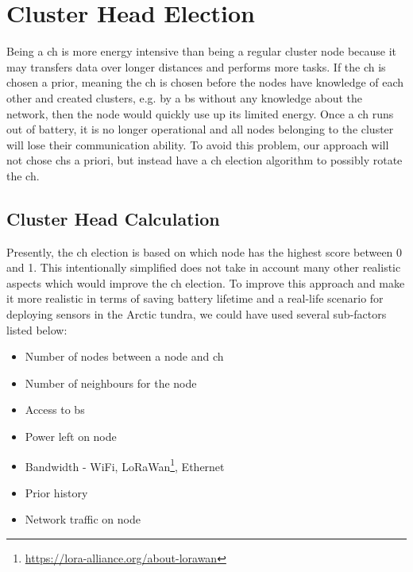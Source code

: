 \documentclass[USenglish]{uit-thesis}
\begin{document}
\section{Cluster Head Election} \label{disc:ch_election}
Being a \gls{ch} is more energy intensive than being a regular cluster node because it may transfers data over longer distances and performs more tasks. If the \gls{ch} is chosen a prior, meaning the \gls{ch} is chosen before the nodes have knowledge of each other and created clusters, e.g. by a \gls{bs} without any knowledge about the network, then the node would quickly use up its limited energy. Once a \gls{ch} runs out of battery, it is no longer operational and all nodes belonging to the cluster will lose their communication ability. To avoid this problem, our approach will not chose \gls{ch}s a priori, but instead have a \gls{ch} election algorithm to possibly rotate the \gls{ch}.




\subsection{Cluster Head Calculation} \label{ssec:ch_election}
Presently, the \gls{ch} election is based on which node has the highest score between $0$ and 1. This intentionally simplified does not take in account many other realistic aspects which would improve the \gls{ch} election. To improve this approach and make it more realistic in terms of saving battery lifetime and a real-life scenario for deploying sensors in the Arctic tundra, we could have used several sub-factors listed below:

\begin{itemize}
\item Number of nodes between a node and \gls{ch}
\item Number of neighbours for the node
\item Access to \gls{bs}
\item Power left on node
\item Bandwidth - WiFi, LoRaWan\footnote{\url{https://lora-alliance.org/about-lorawan}}, Ethernet
\item Prior history
\item Network traffic on node
\end{itemize}
\end{document}
